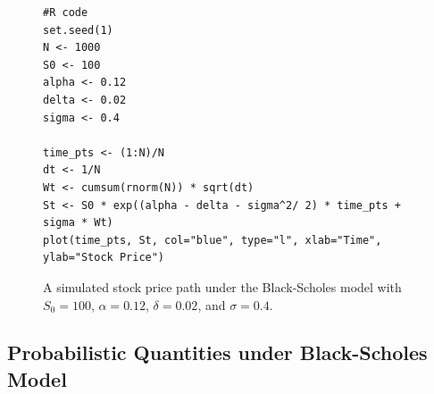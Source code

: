 \begin{enumerate}
\begin{figure}[!h]
\caption{A simulated stock price path under the Black-Scholes model with
\(S_0=100\), \(\alpha=0.12\), \(\delta=0.02\), and \(\sigma=0.4\).}
\begin{verbatim}
#R code
set.seed(1)
N <- 1000
S0 <- 100
alpha <- 0.12
delta <- 0.02
sigma <- 0.4

time_pts <- (1:N)/N
dt <- 1/N
Wt <- cumsum(rnorm(N)) * sqrt(dt)
St <- S0 * exp((alpha - delta - sigma^2/ 2) * time_pts + sigma * Wt)
plot(time_pts, St, col="blue", type="l", xlab="Time", ylab="Stock Price")
\end{verbatim}
\end{figure}
\end{enumerate}
\subsection{Probabilistic Quantities under Black-Scholes Model}
